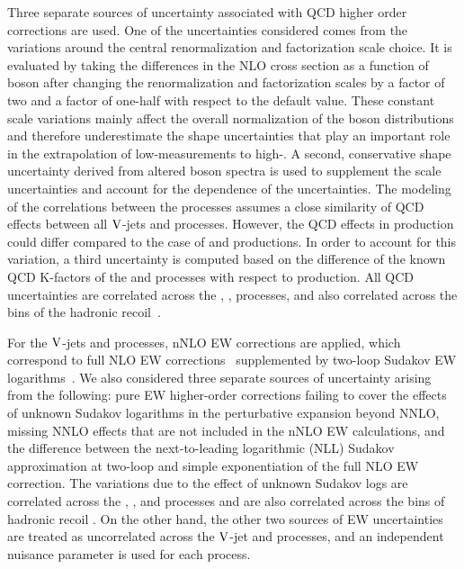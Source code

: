 Three separate sources of uncertainty associated with QCD higher order corrections are used.
One of the uncertainties considered comes from the variations around the central
renormalization and factorization scale choice. It is evaluated by taking the differences in the NLO cross
section as a function of boson \pt after changing the renormalization and factorization scales by a factor of two and a factor
of one-half with respect to the default value. These constant scale variations mainly affect the
overall normalization of the boson \pt distributions and therefore underestimate the shape uncertainties
that play an important role in the extrapolation of low-\pt measurements to high-\pt.
A second, conservative shape uncertainty derived from altered boson \pt spectra is used to
supplement the scale uncertainties and account for the \pt dependence of the uncertainties.
The modeling of the correlations between
the processes assumes a close similarity of QCD effects between all $\mathrm{V}$-jets and \phojets processes.
However, the QCD effects in \phojets production could differ compared to the case of \Zjets and \Wjets productions.
In order to account for this variation, a third uncertainty is computed based on the
difference of the known QCD K-factors
of the \Wjets and \phojets processes with respect to \Zjets production.
All QCD uncertainties are
correlated across the \Zjets, \Wjets, \phojets processes, and also correlated across
the bins of the hadronic recoil~\pt.

For the $\mathrm{V}$-jets and \phojets processes, nNLO EW corrections are applied, which correspond to full
NLO EW corrections~\cite{Denner:2009gj,Denner:2011vu,Denner:2012ts,Kallweit:2015dum}
supplemented by two-loop Sudakov EW logarithms~\cite{Kuhn:2004em,Kuhn:2005gv,Kuhn:2005az,Kuhn:2007cv}.
We also considered three separate sources of uncertainty arising from the
following: pure EW higher-order corrections failing to cover the effects of
unknown Sudakov logarithms in the perturbative expansion beyond NNLO, missing
NNLO effects that are not
included in the nNLO EW calculations, and the difference between the next-to-leading logarithmic
(NLL) Sudakov approximation
at two-loop and simple exponentiation of the full NLO EW correction.
The variations due to the effect of unknown Sudakov
logs are correlated across the \Zjets, \Wjets, and \phojets processes and are also
correlated across the bins of hadronic recoil \pt. On the other hand, the other
two sources of EW uncertainties
are treated as uncorrelated across the $\mathrm{V}$-jet and \phojets processes, and an independent
nuisance parameter is used for each process.

